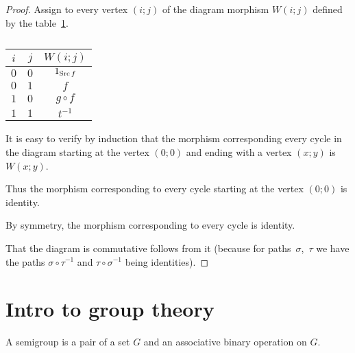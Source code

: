 \begin{proof}
Assign to every vertex $(i;j)$ of the diagram morphism $W(i;j)$
defined by the table~\ref{square-table}.

\begin{table}[h]
\caption{\label{square-table}}


\begin{tabular}{|c|c|c|}
\hline 
$i$ & $j$ & $W(i;j)$\tabularnewline
\hline 
\hline 
$0$ & $0$ & $1_{\operatorname{Src} f}$\tabularnewline
\hline 
$0$ & $1$ & $f$\tabularnewline
\hline 
$1$ & $0$ & $g\circ f$\tabularnewline
\hline 
$1$ & $1$ & $t^{-1}$\tabularnewline
\hline 
\end{tabular}
\end{table}


It is easy to verify by induction that the morphism corresponding
every cycle in the diagram starting at the vertex $(0;0)$ and ending
with a vertex $(x;y)$ is $W(x;y)$.

Thus the morphism corresponding to every cycle starting at the vertex
$(0;0)$ is identity.

By symmetry, the morphism corresponding to every cycle is identity.

That the diagram is commutative follows from it (because for paths~$\sigma$,~$\tau$
we have the paths $\sigma\circ\tau^{-1}$ and $\tau\circ\sigma^{-1}$
being identities).
\end{proof}

\section{Intro to group theory}
\begin{defn}
A semigroup is a pair of a set $G$ and an associative
binary operation on $G$.
\end{defn}

